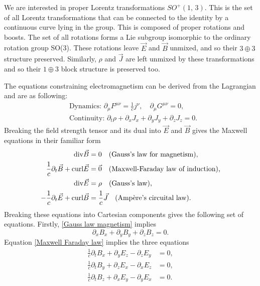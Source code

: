 \documentclass{article}
\begin{document}
We are interested in proper Lorentz transformations $SO^{+}\left(1,\,3\right)$. This is the set of all Lorentz transformations that can be connected to the identity by a continuous curve lying in the group. This is composed of proper rotations and boosts. 
The set of all rotations forms a Lie subgroup isomorphic to the ordinary rotation group SO(3). These rotations leave $\vec{E}$ and $\vec{B}$ unmixed, and so their $3\oplus 3$ structure preserved. Similarly, $\rho$ and $\vec{J}$ are left unmixed by these transformations and so their $1\oplus 3$ block structure is preserved too. \newline

\noindent The equations constraining electromagnetism can be derived from the Lagrangian and are as following: 
\begin{align}
    &\text{Dynamics: }\partial_{\mu}F^{\mu\nu} = \frac{1}{c}j^{\nu},\quad \partial_{\mu}G^{\mu\nu}=0,\\
    &\text{Continuity: }\partial_{t}\rho + \partial_{x}J_{x} + \partial_{y}J_{y} + \partial_{z}J_{z}=0.
\end{align}
Breaking the field strength tensor and its dual into $\vec{E}$ and $\vec{B}$ gives the Maxwell equations in their familiar form
\begin{align}
    \text{div}\vec{B}&=0 \quad \text{(Gauss's law for magnetism),}\label{Gauss law magnetism}\\
    \frac{1}{c}\partial_{t}\vec{B} + \text{curl}\vec{E} &= \vec{0}\quad \text{(Maxwell-Faraday law of induction),}\label{Maxwell Faraday law}\\
    \text{div}\vec{E} &= \rho \quad \text{(Gauss's law),}\label{Gauss law}\\
    -\frac{1}{c}\partial_{t}\vec{E} + \text{curl}\vec{B} &= \frac{1}{c}\vec{J}\quad\text{(Ampère's circuital law).\label{Ampere's law}}
\end{align}
Breaking these equations into Cartesian components gives the following set of equations. Firstly, \eqref{Gauss law magnetism} implies
\begin{equation}
    \partial_{x}B_{x}+\partial_{y}B_{y}+\partial_{z}B_{z}=0.
\end{equation}
Equation \eqref{Maxwell Faraday law} implies the three equations
\begin{align}
    \frac{1}{c}\partial_{t}B_{x}+\partial_{y}E_{z}-\partial_{z}E_{y}&=0,\\
    \frac{1}{c}\partial_{t}B_{y}+\partial_{z}E_{x}-\partial_{x}E_{z}&=0,\\
    \frac{1}{c}\partial_{t}B_{z}+\partial_{x}E_{y}-\partial_{y}E_{x}&=0.
\end{align}
\end{document}
